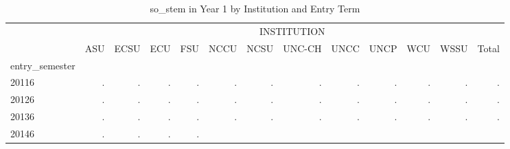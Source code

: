 \begin{table}[!h]
\caption{so\_stem in Year 1 by Institution and Entry Term}
\centering
\begin{tabular}{lllllllllllll}
\cline{1-13}
\multicolumn{1}{c}{} &
  \multicolumn{12}{|c}{INSTITUTION} \\
\multicolumn{1}{c}{} &
  \multicolumn{1}{|r}{ASU} &
  \multicolumn{1}{r}{ECSU} &
  \multicolumn{1}{r}{ECU} &
  \multicolumn{1}{r}{FSU} &
  \multicolumn{1}{r}{NCCU} &
  \multicolumn{1}{r}{NCSU} &
  \multicolumn{1}{r}{UNC-CH} &
  \multicolumn{1}{r}{UNCC} &
  \multicolumn{1}{r}{UNCP} &
  \multicolumn{1}{r}{WCU} &
  \multicolumn{1}{r}{WSSU} &
  \multicolumn{1}{r}{Total} \\
\cline{1-13}
\multicolumn{1}{l}{entry\_semester} &
  \multicolumn{1}{|r}{} &
  \multicolumn{1}{r}{} &
  \multicolumn{1}{r}{} &
  \multicolumn{1}{r}{} &
  \multicolumn{1}{r}{} &
  \multicolumn{1}{r}{} &
  \multicolumn{1}{r}{} &
  \multicolumn{1}{r}{} &
  \multicolumn{1}{r}{} &
  \multicolumn{1}{r}{} &
  \multicolumn{1}{r}{} &
  \multicolumn{1}{r}{} \\
\multicolumn{1}{l}{\hspace{1em}20116} &
  \multicolumn{1}{|r}{.} &
  \multicolumn{1}{r}{.} &
  \multicolumn{1}{r}{.} &
  \multicolumn{1}{r}{.} &
  \multicolumn{1}{r}{.} &
  \multicolumn{1}{r}{.} &
  \multicolumn{1}{r}{.} &
  \multicolumn{1}{r}{.} &
  \multicolumn{1}{r}{.} &
  \multicolumn{1}{r}{.} &
  \multicolumn{1}{r}{.} &
  \multicolumn{1}{r}{.} \\
\multicolumn{1}{l}{\hspace{1em}20126} &
  \multicolumn{1}{|r}{.} &
  \multicolumn{1}{r}{.} &
  \multicolumn{1}{r}{.} &
  \multicolumn{1}{r}{.} &
  \multicolumn{1}{r}{.} &
  \multicolumn{1}{r}{.} &
  \multicolumn{1}{r}{.} &
  \multicolumn{1}{r}{.} &
  \multicolumn{1}{r}{.} &
  \multicolumn{1}{r}{.} &
  \multicolumn{1}{r}{.} &
  \multicolumn{1}{r}{.} \\
\multicolumn{1}{l}{\hspace{1em}20136} &
  \multicolumn{1}{|r}{.} &
  \multicolumn{1}{r}{.} &
  \multicolumn{1}{r}{.} &
  \multicolumn{1}{r}{.} &
  \multicolumn{1}{r}{.} &
  \multicolumn{1}{r}{.} &
  \multicolumn{1}{r}{.} &
  \multicolumn{1}{r}{.} &
  \multicolumn{1}{r}{.} &
  \multicolumn{1}{r}{.} &
  \multicolumn{1}{r}{.} &
  \multicolumn{1}{r}{.} \\
\multicolumn{1}{l}{\hspace{1em}20146} &
  \multicolumn{1}{|r}{.} &
  \multicolumn{1}{r}{.} &
  \multicolumn{1}{r}{.} &
  \multicolumn{1}{r}{.} &

\end{tabular}
\end{table}
